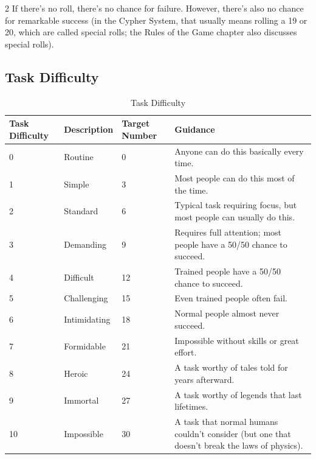 \begin{multicols}{2}
If there’s no roll, there’s no chance for failure. However, there’s also no chance for remarkable success (in the Cypher System, that usually means rolling a 19 or 20, which are called special rolls; the Rules of the Game chapter also discusses special rolls).

\subsection{Task Difficulty}


\begin{table}[h!]
\centering

\caption{Task Difficulty}
\label{tab:Task Difficulty}

\begin{tabularx}{\textwidth}{| p{} | p{} | p{} | p{} |}
\hline
\textbf{Task \newline Difficulty} & \textbf{Description} & \textbf{Target Number} & \textbf{Guidance} \\
\hline
0 & Routine & 0 & Anyone can do this basically every time.  \\ \hline
1 & Simple & 3 & Most people can do this most of the time.  \\ \hline
2 & Standard & 6 & Typical task requiring focus, but most people can usually do this.  \\ \hline
3 & Demanding & 9 & Requires full attention; most people have a 50/50 chance to succeed.  \\ \hline
4 & Difficult & 12 & Trained people have a 50/50 chance to succeed.  \\ \hline
5 & Challenging & 15 & Even trained people often fail.  \\ \hline
6 & Intimidating & 18 & Normal people almost never succeed.  \\ \hline
7 & Formidable & 21 & Impossible without skills or great effort.  \\ \hline
8 & Heroic & 24 & A task worthy of tales told for years afterward.  \\ \hline
9 & Immortal & 27 & A task worthy of legends that last lifetimes.  \\ \hline
10 & Impossible & 30 & A task that normal humans couldn’t consider (but one that doesn’t break the laws of physics).  \\ \hline


\end{tabularx}
\end{table}
\end{multicols}
